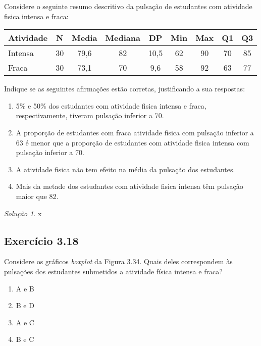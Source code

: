 \documentclass[
]{latex/krantz}
\providecommand{\tightlist}{%
  \setlength{\itemsep}{0pt}\setlength{\parskip}{0pt}}
\theoremstyle{definition}
\theoremstyle{definition}
\theoremstyle{definition}
\theoremstyle{definition}
\theoremstyle{remark}
\newtheorem*{solution}{Solução}
\begin{document}
Considere o seguinte resumo descritivo da pulsação de estudantes com atividade fisica intensa e fraca:

\begin{longtable}[]{@{}lcccccccc@{}}
\toprule\noalign{}
Atividade & N & Media & Mediana & DP & Min & Max & Q1 & Q3 \\
\midrule\noalign{}
\endhead
\bottomrule\noalign{}
\endlastfoot
Intensa & 30 & 79,6 & 82 & 10,5 & 62 & 90 & 70 & 85 \\
Fraca & 30 & 73,1 & 70 & 9,6 & 58 & 92 & 63 & 77 \\
\end{longtable}

Indique se as seguintes afirmações estão corretas, justificando a sua respostas:

\begin{enumerate}
\def\labelenumi{\alph{enumi})}
\tightlist
\item
  5\% e 50\% dos estudantes com atividade fisica intensa e fraca, respectivamente, tiveram pulsação inferior a 70.
\item
  A proporção de estudantes com fraca atividade fisica com pulsação inferior a 63 é menor que a proporção de estudantes com atividade fisica intensa com pulsação inferior a 70.
\item
  A atividade fisica não tem efeito na média da pulsação dos estudantes.
\item
  Mais da metade dos estudantes com atividade fisica intensa têm pulsação maior que 82.
\end{enumerate}

\begin{solution}
x
\end{solution}

\hypertarget{exr3-18}{%
\subsection*{Exercício 3.18}\label{exr3-18}}

Considere os gráficos \emph{boxplot} da Figura 3.34. Quais deles correspondem às pulsações dos estudantes submetidos a atividade física intensa e fraca?

\begin{enumerate}
\def\labelenumi{\alph{enumi})}
\tightlist
\item
  A e B
\item
  B e D
\item
  A e C
\item
  B e C
\end{enumerate}
\end{document}

